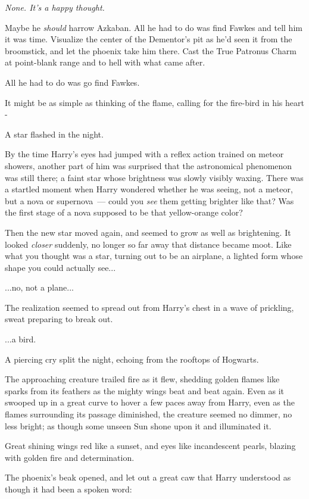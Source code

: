\emph{None. It's a happy thought.}

Maybe he \emph{should} harrow Azkaban. All he had to do was find Fawkes and tell him it was time. Visualize the center of the Dementor's pit as he'd seen it from the broomstick, and let the phoenix take him there. Cast the True Patronus Charm at point-blank range and to hell with what came after.

All he had to do was go find Fawkes.

It might be as simple as thinking of the flame, calling for the fire-bird in his heart -

A star flashed in the night.

By the time Harry's eyes had jumped with a reflex action trained on meteor showers, another part of him was surprised that the astronomical phenomenon was still there; a faint star whose brightness was slowly visibly waxing. There was a startled moment when Harry wondered whether he was seeing, not a meteor, but a nova or supernova~--- could you \emph{see} them getting brighter like that? Was the first stage of a nova supposed to be that yellow-orange color?

Then the new star moved again, and seemed to grow as well as brightening. It looked \emph{closer} suddenly, no longer so far away that distance became moot. Like what you thought was a star, turning out to be an airplane, a lighted form whose shape you could actually see...

...no, not a plane...

The realization seemed to spread out from Harry's chest in a wave of prickling, sweat preparing to break out.

...a bird.

A piercing cry split the night, echoing from the rooftops of Hogwarts.

The approaching creature trailed fire as it flew, shedding golden flames like sparks from its feathers as the mighty wings beat and beat again. Even as it swooped up in a great curve to hover a few paces away from Harry, even as the flames surrounding its passage diminished, the creature seemed no dimmer, no less bright; as though some unseen Sun shone upon it and illuminated it.

Great shining wings red like a sunset, and eyes like incandescent pearls, blazing with golden fire and determination.

The phoenix's beak opened, and let out a great caw that Harry understood as though it had been a spoken word:

